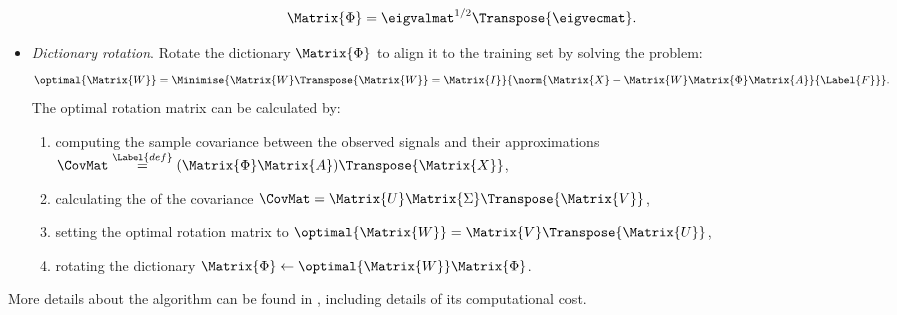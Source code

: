 \documentclass{article}
\def \Feas{\Matrix{X}} 	%
\def \Dic{\Matrix{\Phi}} %
\def \Coeff{\Matrix{A}} 	%
\def \coherence{\mu} 		%
\def \orthmat{\Matrix{W}} 	%
\def \definition{\overset{\Label{def}}{=}}	%
\def \Gram{\Matrix{G}} 						%
\begin{document}
\begin{itemize}
\begin{enumerate}
\begin{equation}
\Dic = \eigvalmat^{1/2}\Transpose{\eigvecmat}.
\end{equation}
\end{enumerate}
\item \emph{Dictionary rotation}. Rotate the dictionary $\Dic$ to align it to the training set by solving the problem:
\begin{equation}\label{eq:rot}
	\optimal{\orthmat} = \Minimise{\orthmat \Transpose{\orthmat} = \Matrix{I}}{\norm{\Feas - \orthmat\Dic\Coeff}{\Label{F}}}.
\end{equation}
The optimal rotation matrix can be calculated by:
\begin{enumerate}
\item computing the sample covariance between the observed signals and their approximations $\CovMat \definition (\Dic\Coeff)\Transpose{\Feas}$,
\item calculating the  of the covariance $\CovMat = \Matrix{U}\Matrix{\Sigma}\Transpose{\Matrix{V}}$,
\item setting the optimal rotation matrix to $\optimal{\orthmat}=\Matrix{V}\Transpose{\Matrix{U}}$,
\item rotating the dictionary $\Dic \leftarrow \optimal{\orthmat}\Dic$.
\end{enumerate}
\end{itemize}

More details about the  algorithm can be found in  \cite{Barchiesi2013Le}, including details of its computational cost.
%
\end{document}
